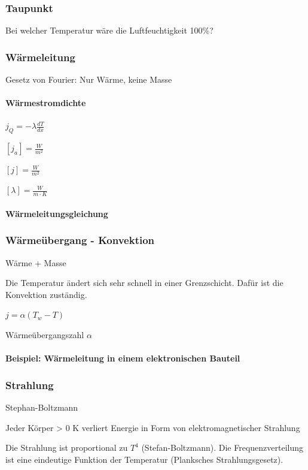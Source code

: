 \documentclass[a4paper]{scrartcl}
\begin{document}
\subsubsection{Taupunkt}

Bei welcher Temperatur wäre die Luftfeuchtigkeit 100\%?


\subsubsection{Wärmeleitung}
Gesetz von Fourier: Nur Wärme, keine Masse

\paragraph{Wärmestromdichte} $j_Q = - \lambda \frac{dT}{dx}$


$[j_a] = \frac{W}{m^2}$


$[j] = \frac{W}{m^2}$

$[\lambda] = \frac{W}{m \cdot K}$

\paragraph{Wärmeleitungsgleichung} %

\subsubsection{Wärmeübergang - Konvektion}
Wärme + Masse

Die Temperatur ändert sich sehr schnell in einer Grenzschicht. Dafür ist die Konvektion zuständig.

$j = \alpha (T_w - T)$

Wärmeübergangszahl $\alpha$

\paragraph{Beispiel: Wärmeleitung in einem elektronischen Bauteil}




\subsubsection{Strahlung}
Stephan-Boltzmann


Jeder Körper > 0 K verliert Energie in Form von elektromagnetischer Strahlung

Die Strahlung ist proportional zu $T^4$ (Stefan-Boltzmann). Die Frequenzverteilung ist eine eindeutige Funktion der Temperatur (Planksches Strahlungsgesetz).
\end{document}
